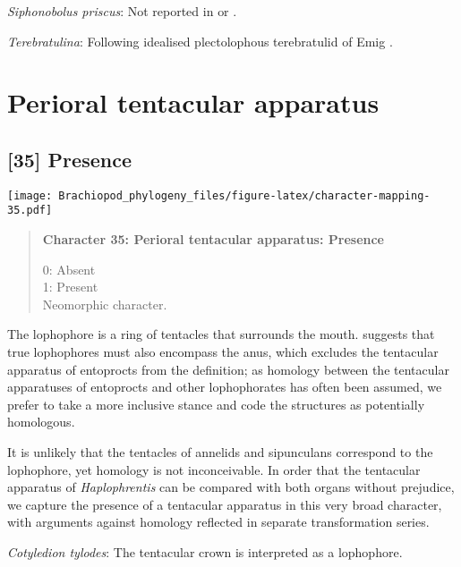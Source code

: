\documentclass[openany]{book}
\theoremstyle{definition}
\theoremstyle{definition}
\theoremstyle{definition}
\theoremstyle{remark}
\begin{document}
\hypertarget{Siphonobolus_priscus-coding-34}{}
\emph{Siphonobolus priscus}: Not reported in
\citet{Havlicek1982LingulaceaPaterinacea} or
\citet{Williams2000LinguliformeaCraniiformea}.

\hypertarget{Terebratulina-coding-34}{}
\emph{Terebratulina}: Following idealised plectolophous terebratulid of
Emig \citeyearpar{Emig1992Functionaldisposition}.

\section{Perioral tentacular
apparatus}\label{perioral-tentacular-apparatus}

\subsection*{{[}35{]} Presence}\label{presence-1}

\texttt{[image: Brachiopod\_phylogeny\_files/figure-latex/character-mapping-35.pdf]}

\begin{quote}
\textbf{Character 35: Perioral tentacular apparatus: Presence}

0: Absent\\
1: Present\\
Neomorphic character.
\end{quote}

The lophophore is a ring of tentacles that surrounds the mouth.
\citet{Temereva2017Innervationof} suggests that true lophophores must
also encompass the anus, which excludes the tentacular apparatus of
entoprocts from the definition; as homology between the tentacular
apparatuses of entoprocts and other lophophorates has often been
assumed, we prefer to take a more inclusive stance and code the
structures as potentially homologous.

It is unlikely that the tentacles of annelids and sipunculans correspond
to the lophophore, yet homology is not inconceivable. In order that the
tentacular apparatus of \emph{Haplophrentis} can be compared with both
organs without prejudice, we capture the presence of a tentacular
apparatus in this very broad character, with arguments against homology
reflected in separate transformation series.

\hypertarget{Cotyledion_tylodes-coding-35}{}
\emph{Cotyledion tylodes}: The tentacular crown \citep{Zhang2013} is
interpreted as a lophophore.
\end{document}
